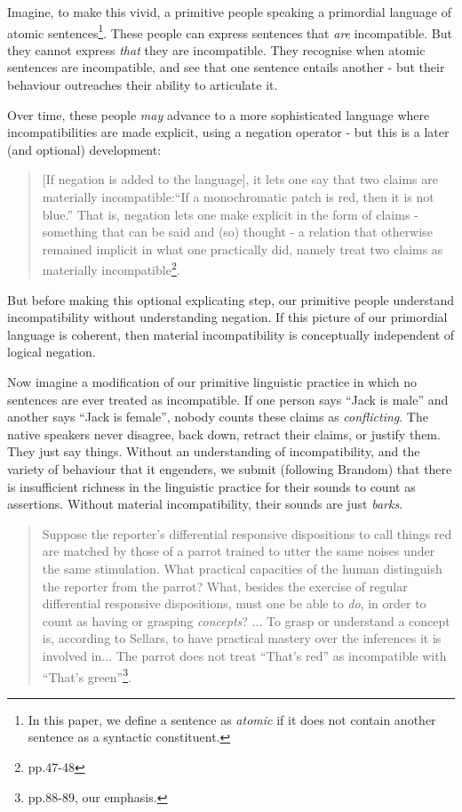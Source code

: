 Imagine, to make this vivid, a primitive people speaking a primordial
language of atomic sentences\footnote{In this paper, we define a sentence as \emph{atomic} if it does
  not contain another sentence as a syntactic constituent.}. These people can express sentences
that \emph{are} incompatible.  But they cannot express \emph{that}
they are incompatible.  They recognise when atomic sentences are
incompatible, and see that one sentence entails another - but their
behaviour outreaches their ability to articulate it.

Over time, these people \emph{may} advance to a more sophisticated
language where incompatibilities are made explicit, using a negation
operator - but this is a later (and optional) development:
\begin{quote}
[If negation is added to the language], it lets one say that two
claims are materially incompatible:``If a monochromatic patch is red,
then it is not blue.'' That is, negation lets one make explicit in the
form of claims - something that can be said and (so) thought - a
relation that otherwise remained implicit in what one practically did,
namely treat two claims as materially
incompatible\footnote{\cite{brandom} pp.47-48}.
\end{quote}

\NI But before making this optional
explicating step, our primitive people understand incompatibility
without understanding negation.  If this picture of our primordial
language is coherent, then material incompatibility is conceptually
independent of logical negation.

Now imagine a modification of our primitive linguistic practice in
which no sentences are ever treated as incompatible.  If one person
says ``Jack is male'' and another says ``Jack is female'', nobody
counts these claims as \emph{conflicting}.  The native speakers never
disagree, back down, retract their claims, or justify them. They just
say things.  Without an understanding of incompatibility, and the
variety of behaviour that it engenders, we submit (following Brandom)
that there is insufficient richness in the linguistic practice for
their sounds to count as assertions.  Without material
incompatibility, their sounds are just \emph{barks}.
\begin{quote}

  Suppose the reporter's differential responsive dispositions to call
  things red are matched by those of a parrot trained to utter the
  same noises under the same stimulation. What practical capacities of
  the human distinguish the reporter from the parrot? What, besides
  the exercise of regular differential responsive dispositions, must
  one be able to \emph{do}, in order to count as having or grasping
  \emph{concepts}? ... To grasp or understand a concept is, according
  to Sellars, to have practical mastery over the inferences it is
  involved in... The parrot does not treat ``That's red'' as
  incompatible with ``That's green''\footnote{\cite{brandom2}
    pp.88-89, our emphasis.}.
\end{quote}

